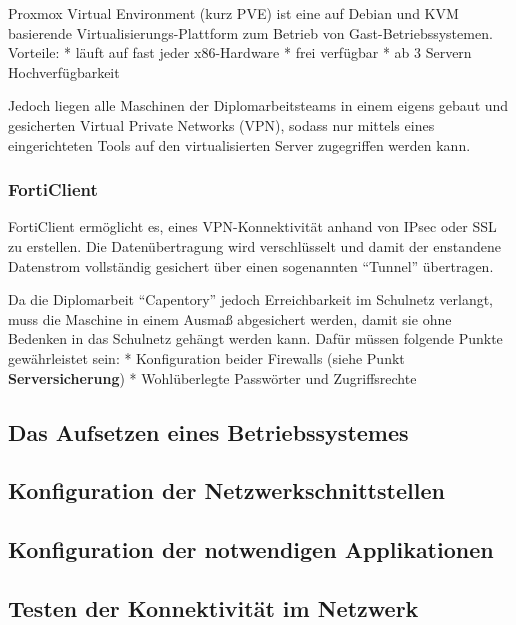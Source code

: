 Proxmox Virtual Environment (kurz PVE) ist eine auf Debian und KVM
basierende Virtualisierungs-Plattform zum Betrieb von
Gast-Betriebssystemen. Vorteile: * läuft auf fast jeder x86-Hardware *
frei verfügbar * ab 3 Servern Hochverfügbarkeit

Jedoch liegen alle Maschinen der Diplomarbeitsteams in einem eigens
gebaut und gesicherten Virtual Private Networks (VPN), sodass nur
mittels eines eingerichteten Tools auf den virtualisierten Server
zugegriffen werden kann.

\hypertarget{forticlient}{%
\subsubsection{FortiClient}\label{forticlient}}

FortiClient ermöglicht es, eines VPN-Konnektivität anhand von IPsec oder
SSL zu erstellen. Die Datenübertragung wird verschlüsselt und damit der
enstandene Datenstrom vollständig gesichert über einen sogenannten
``Tunnel'' übertragen.

Da die Diplomarbeit ``Capentory'' jedoch Erreichbarkeit im Schulnetz
verlangt, muss die Maschine in einem Ausmaß abgesichert werden, damit
sie ohne Bedenken in das Schulnetz gehängt werden kann. Dafür müssen
folgende Punkte gewährleistet sein: * Konfiguration beider Firewalls
(siehe Punkt \textbf{Serversicherung}) * Wohlüberlegte Passwörter und
Zugriffsrechte

\hypertarget{das-aufsetzen-eines-betriebssystemes}{%
\subsection{Das Aufsetzen eines
Betriebssystemes}\label{das-aufsetzen-eines-betriebssystemes}}

\hypertarget{konfiguration-der-netzwerkschnittstellen}{%
\subsection{Konfiguration der
Netzwerkschnittstellen}\label{konfiguration-der-netzwerkschnittstellen}}

\hypertarget{konfiguration-der-notwendigen-applikationen}{%
\subsection{Konfiguration der notwendigen
Applikationen}\label{konfiguration-der-notwendigen-applikationen}}

\hypertarget{testen-der-konnektivituxe4t-im-netzwerk}{%
\subsection{Testen der Konnektivität im
Netzwerk}\label{testen-der-konnektivituxe4t-im-netzwerk}}

